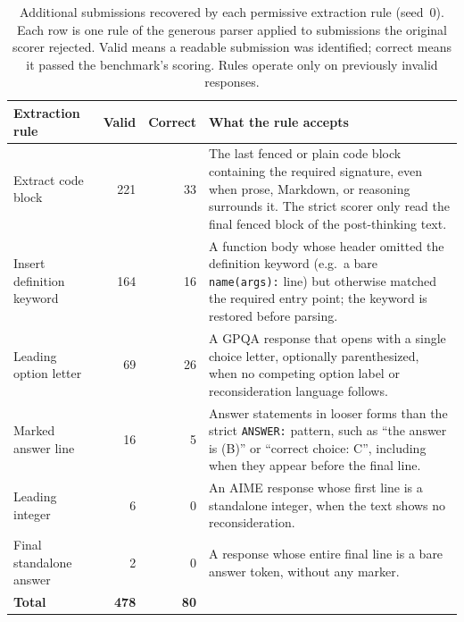 \begin{table}[htbp]
\centering
\footnotesize
\setlength{\tabcolsep}{6pt}
\renewcommand{\arraystretch}{1.3}
\caption{Additional submissions recovered by each permissive extraction rule (seed~0).
Each row is one rule of the generous parser applied to submissions the original scorer
rejected. Valid means a readable submission was identified; correct means it passed the
benchmark's scoring. Rules operate only on previously invalid responses.}
\label{tab:generous-parser-recovery}
\begin{tabular}{@{}p{}rrp{}@{}}
\hline
Extraction rule & \multicolumn{1}{r}{Valid} & \multicolumn{1}{r}{Correct} & What the rule accepts \\
\hline
Extract code block & 221 & 33 & The last fenced or plain code block containing the
required signature, even when prose, Markdown, or reasoning surrounds it. The strict
scorer only read the final fenced block of the post-thinking text. \\
Insert definition keyword & 164 & 16 & A function body whose header omitted the
definition keyword (e.g.\ a bare \texttt{name(args):} line) but otherwise matched the
required entry point; the keyword is restored before parsing. \\
Leading option letter & 69 & 26 & A GPQA response that opens with a single choice
letter, optionally parenthesized, when no competing option label or reconsideration
language follows. \\
Marked answer line & 16 & 5 & Answer statements in looser forms than the strict
\texttt{ANSWER:} pattern, such as ``the answer is (B)'' or ``correct choice: C'',
including when they appear before the final line. \\
Leading integer & 6 & 0 & An AIME response whose first line is a standalone integer,
when the text shows no reconsideration. \\
Final standalone answer & 2 & 0 & A response whose entire final line is a bare answer
token, without any marker. \\
\hline
\textbf{Total} & \textbf{478} & \textbf{80} & \\
\hline
\end{tabular}
\end{table}
